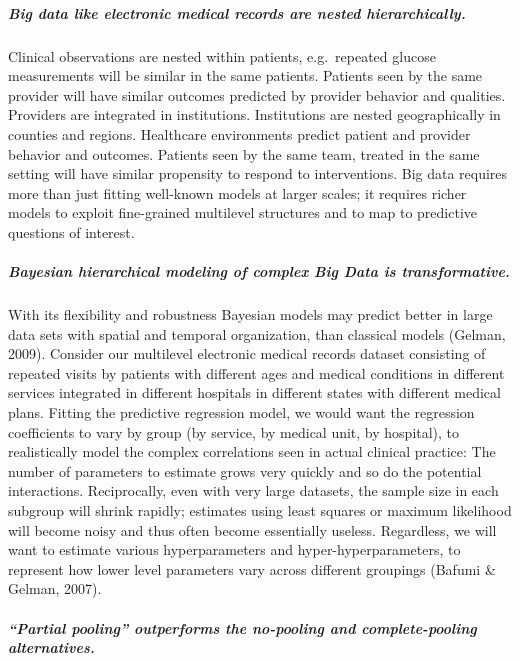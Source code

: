 \documentclass[]{article}
\begin{document}
\subparagraph{Big data like electronic medical records are nested
hierarchically.}\label{big-data-like-electronic-medical-records-are-nested-hierarchically.}

Clinical observations are nested within patients, e.g.~repeated glucose
measurements will be similar in the same patients. Patients seen by the
same provider will have similar outcomes predicted by provider behavior
and qualities. Providers are integrated in institutions. Institutions
are nested geographically in counties and regions. Healthcare
environments predict patient and provider behavior and outcomes.
Patients seen by the same team, treated in the same setting will have
similar propensity to respond to interventions. Big data requires more
than just fitting well-known models at larger scales; it requires richer
models to exploit fine-grained multilevel structures and to map to
predictive questions of interest.

\subparagraph{Bayesian hierarchical modeling of complex Big Data is
transformative.}\label{bayesian-hierarchical-modeling-of-complex-big-data-is-transformative.}

With its flexibility and robustness Bayesian models may predict better
in large data sets with spatial and temporal organization, than
classical models (Gelman, 2009). Consider our multilevel electronic
medical records dataset consisting of repeated visits by patients with
different ages and medical conditions in different services integrated
in different hospitals in different states with different medical plans.
Fitting the predictive regression model, we would want the regression
coefficients to vary by group (by service, by medical unit, by
hospital), to realistically model the complex correlations seen in
actual clinical practice: The number of parameters to estimate grows
very quickly and so do the potential interactions. Reciprocally, even
with very large datasets, the sample size in each subgroup will shrink
rapidly; estimates using least squares or maximum likelihood will become
noisy and thus often become essentially useless. Regardless, we will
want to estimate various hyperparameters and hyper-hyperparameters, to
represent how lower level parameters vary across different groupings
(Bafumi \& Gelman, 2007).

\subparagraph{``Partial pooling'' outperforms the no-pooling and
complete-pooling
alternatives.}\label{partial-pooling-outperforms-the-no-pooling-and-complete-pooling-alternatives.}
\end{document}
